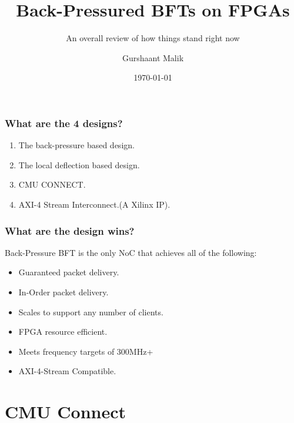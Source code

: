 \documentclass{beamer}
\title{Back-Pressured BFTs on FPGAs}
\subtitle{An overall review of how things stand right now}
\author{Gurshaant Malik}
\date{\today}
\begin{document}
	\frame{\titlepage}
	\begin{frame}
		\frametitle{What are the 4 designs?}
		\pause
		\begin{enumerate}
			\item The back-pressure based design.
			\pause
			\item The local deflection based design.
			\pause 
			\item CMU CONNECT.
			\pause
			\item AXI-4 Stream Interconnect.\pause(A Xilinx IP).
		\end{enumerate}
	\end{frame}
	
	\begin{frame}
    \frametitle{What are the design wins?}
    \pause
           Back-Pressure BFT is the only NoC that achieves all of the following:
           \pause
           \begin{itemize}
               \item Guaranteed packet delivery.
               \pause 
               \item In-Order packet delivery.
               \pause
               \item Scales to support any number of clients.
               \pause
               \item FPGA resource efficient.
               \pause
               \item Meets frequency targets of 300MHz+
               \pause
               \item AXI-4-Stream Compatible.
           \end{itemize}
    \end{frame}

	\setcounter{showProgressBar}{1}
	\setcounter{showSlideNumbers}{1}
	
	\section{CMU Connect}
	
\end{document}
